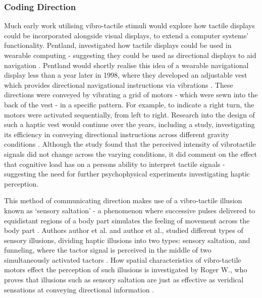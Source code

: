 \documentclass{interim}
\begin{document}
\subsubsection{Coding Direction}
Much early work utilising vibro-tactile stimuli would explore how tactile displays could be incorporated alongside visual displays, to extend a computer systems’ functionality. Pentland, investigated how tactile displays could be used in wearable computing - suggesting they could be used as directional displays to aid navigation \cite{629923}. Pentland would shortly realise this idea of a wearable navigational display less than a year later in 1998, where they developed an adjustable vest which provides directional navigational instructions via vibrations \cite{729547}. These directions were conveyed by vibrating a grid of motors - which were sewn into the back of the vest - in a specific pattern. For example, to indicate a right turn, the motors were activated sequentially, from left to right. Research into the design of such a haptic vest would continue over the years, including a study, investigating its efficiency in conveying directional instructions across different gravity conditions \cite{998954}. Although the study found that the perceived intensity of vibrotactile signals did not change across the varying conditions, it did comment on the effect that cognitive load has on a persons ability to interpret tactile signals - suggesting the need for further psychophysical experiments investigating haptic perception.

This method of communicating direction makes use of a vibro-tactile illusion known as ‘sensory saltation' - a phenomenon where successive pulses delivered to equidistant regions of a body part simulates the feeling of movement across the body part \cite{geldard1975sensory}. Authors author et al. and author et al., studied different types of sensory illusions, dividing haptic illusions into two types: sensory saltation, and funneling, where the tactor signal is perceived in the middle of two simultaneously activated tactors \cite{5710913, s150407913}. How spatial characteristics of vibro-tactile motors effect the perception of such illusions is investigated by Roger W., who proves that illusions such as sensory saltation are just as effective as veridical sensations at conveying directional information \cite{cholewiak2000generation}.
\end{document}
